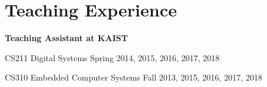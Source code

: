 \section*{Teaching Experience}

\begin{description}

\item {\bf Teaching Assistant at KAIST}
\item CS211 Digital Systems \dotfill Spring 2014, 2015, 2016, 2017, 2018
\item CS310 Embedded Computer Systems \dotfill Fall 2013, 2015, 2016, 2017, 2018

\end{description}
